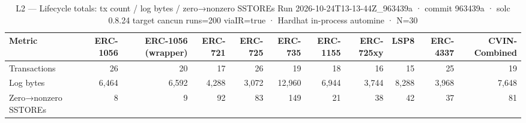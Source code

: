 \begin{table}[ht]
\centering
\small
\begin{tabular}{lrrrrrrrrrr}
\toprule
Metric & ERC-1056 & ERC-1056 (wrapper) & ERC-721 & ERC-725 & ERC-735 & ERC-1155 & ERC-725xy & LSP8 & ERC-4337 & CVIN-Combined \\
\midrule
Transactions & 26 & 20 & 17 & 26 & 19 & 18 & 16 & 15 & 25 & 19 \\
Log bytes & 6,464 & 6,592 & 4,288 & 3,072 & 12,960 & 6,944 & 3,744 & 8,288 & 3,968 & 7,648 \\
Zero→nonzero SSTOREs & 8 & 9 & 92 & 83 & 149 & 21 & 38 & 42 & 37 & 81 \\
\bottomrule
\end{tabular}
\caption{L2 — Lifecycle totals: tx count / log bytes / zero→nonzero SSTOREs Run 2026-10-24T13-13-44Z\_963439a · commit 963439a · solc 0.8.24 target cancun runs=200 viaIR=true · Hardhat in-process automine · N=30}
\label{tab:lifecycle_totals}
\end{table}
